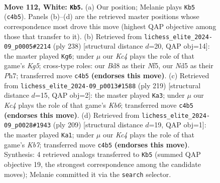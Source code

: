 \documentclass[11pt]{article}
\begin{document}
\clearpage

\begin{figure}[p]\centering
\begin{subfigure}{0.46\textwidth}\centering
\resizebox{\linewidth}{!}{%
\newchessgame
\chessboard[
  setfen={3B4/1k6/8/3N2R1/2K5/8/8/7q w - - 0 112},
  showmover=false,
  pgfstyle=straightmove, color=movearrow, markmove={c4-b5}
]}
\caption{}
\end{subfigure}\hfill
\begin{subfigure}{0.46\textwidth}\centering
\resizebox{\linewidth}{!}{%
\newchessgame
\chessboard[
  setfen={7r/R6P/8/3k1NK1/8/8/8/8 w - - 3 120},
  showmover=false,
  pgfstyle=straightmove, color=movearrow, markmove={g5-g6}
]}
\caption{}
\end{subfigure}
\\[4pt]
\begin{subfigure}{0.46\textwidth}\centering
\resizebox{\linewidth}{!}{%
\newchessgame
\chessboard[
  setfen={8/8/3K4/7b/1r6/1k6/8/1Q6 b - - 57 110},
  showmover=false,
  pgfstyle=straightmove, color=movearrow, markmove={b3-a3}
]}
\caption{}
\end{subfigure}\hfill
\begin{subfigure}{0.46\textwidth}\centering
\resizebox{\linewidth}{!}{%
\newchessgame
\chessboard[
  setfen={8/8/8/8/1Q6/4K3/1kr5/8 b - - 16 105},
  showmover=false,
  pgfstyle=straightmove, color=movearrow, markmove={b2-a1}
]}
\caption{}
\end{subfigure}
\caption{\textbf{Move 112, White: \texttt{Kb5}.} (a) Our position; Melanie plays \texttt{Kb5} (\texttt{c4b5}). Panels (b)--(d) are the retrieved master positions whose correspondence most drove this move (highest QAP objective among those that transfer to it). (b) Retrieved from \texttt{lichess\_elite\_2024-09\_p0005\#2214} (ply 238) [structural distance $d$=20, QAP obj=14]: the master played \texttt{Kg6}; under $\mu$ our \emph{Kc4} plays the role of that game's \emph{Kg5}; cross-type roles: our \emph{B}d8 as their \emph{N}f5, our \emph{N}d5 as their \emph{P}h7; transferred move \texttt{c4b5} \textbf{(endorses this move)}. (c) Retrieved from \texttt{lichess\_elite\_2024-09\_p0013\#1588} (ply 219) [structural distance $d$=15, QAP obj=2]: the master played \texttt{Ka3}; under $\mu$ our \emph{Kc4} plays the role of that game's \emph{Kb6}; transferred move \texttt{c4b5} \textbf{(endorses this move)}. (d) Retrieved from \texttt{lichess\_elite\_2024-09\_p0028\#1943} (ply 209) [structural distance $d$=19, QAP obj=1]: the master played \texttt{Ka1}; under $\mu$ our \emph{Kc4} plays the role of that game's \emph{Kb7}; transferred move \texttt{c4b5} \textbf{(endorses this move)}. Synthesis: 4 retrieved analogs transferred to \texttt{Kb5} (summed QAP objective 19, the strongest correspondence among the candidate moves); Melanie committed it via the \texttt{search} selector.}
\label{fig:thought-m222}
\end{figure}
\end{document}
